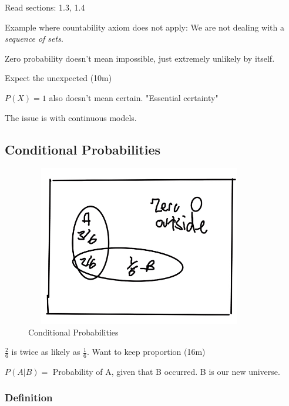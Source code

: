 
 Read sections: 1.3, 1.4\\

Example where countability axiom does not apply: We are not dealing with a \textit{sequence of sets}.

Zero probability doesn't mean impossible, just extremely unlikely by itself.

Expect the unexpected (10m)

$P(X)=1$ also doesn't mean certain.  "Essential certainty"

The issue is with continuous models.

\subsection{Conditional Probabilities}

\begin{figure}[ht]
\centering
\includegraphics[width=10cm, height=7cm]{images/L02/cond_prob.jpeg}
\caption{Conditional Probabilities}
\end{figure}

$\frac{2}{6}$ is twice as likely as $\frac{1}{6}$. Want to keep proportion (16m)

$P(A|B)=$ Probability of A, given that B occurred.  B is our new universe.

\subsubsection{Definition}

